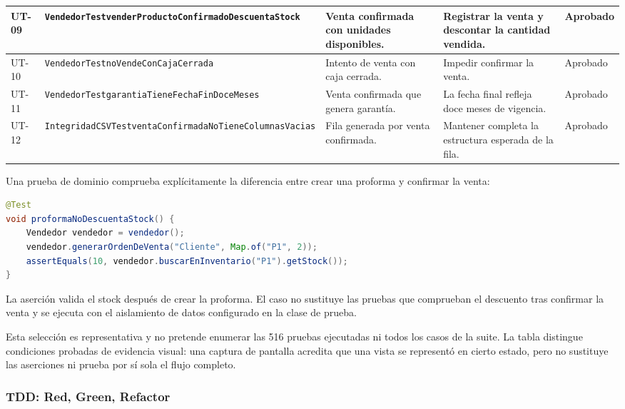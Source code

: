\begin{longtable}{|p{1cm}|p{3.4cm}|p{3.4cm}|p{3.1cm}|p{2.1cm}|}
\hline
UT-09 & \texttt{VendedorTest}\newline\texttt{venderProducto\allowbreak Confirmado\allowbreak DescuentaStock} & Venta confirmada con unidades disponibles. & Registrar la venta y descontar la cantidad vendida. & Aprobado\\
\hline
UT-10 & \texttt{VendedorTest}\newline\texttt{noVendeConCaja\allowbreak Cerrada} & Intento de venta con caja cerrada. & Impedir confirmar la venta. & Aprobado\\
\hline
UT-11 & \texttt{VendedorTest}\newline\texttt{garantia\allowbreak Tiene\allowbreak Fecha\allowbreak FinDoce\allowbreak Meses} & Venta confirmada que genera garantía. & La fecha final refleja doce meses de vigencia. & Aprobado\\
\hline
UT-12 & \texttt{Integridad\allowbreak CSVTest}\newline\texttt{ventaConfirmada\allowbreak NoTiene\allowbreak ColumnasVacias} & Fila generada por venta confirmada. & Mantener completa la estructura esperada de la fila. & Aprobado\\
\hline
\end{longtable}
\normalsize

Una prueba de dominio comprueba explícitamente la diferencia entre crear una proforma y confirmar la venta:

\begin{lstlisting}[language=Java,caption={Prueba real: una proforma no descuenta existencias.},label={lst:test-proforma}]
@Test
void proformaNoDescuentaStock() {
    Vendedor vendedor = vendedor();
    vendedor.generarOrdenDeVenta("Cliente", Map.of("P1", 2));
    assertEquals(10, vendedor.buscarEnInventario("P1").getStock());
}
\end{lstlisting}

La aserción valida el stock después de crear la proforma. El caso no sustituye las pruebas que comprueban el descuento tras confirmar la venta y se ejecuta con el aislamiento de datos configurado en la clase de prueba.

Esta selección es representativa y no pretende enumerar las 516 pruebas ejecutadas ni todos los casos de la suite. La tabla distingue condiciones probadas de evidencia visual: una captura de pantalla acredita que una vista se representó en cierto estado, pero no sustituye las aserciones ni prueba por sí sola el flujo completo.

\subsubsection{TDD: Red, Green, Refactor}

